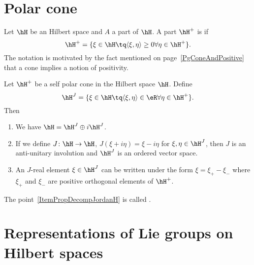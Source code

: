 \section{Polar cone}

Let $\hH$ be an Hilbert space and $A$ a part of $\hH$. A part $\hH^+$ is  if
\begin{equation}
	\hH^+=\{ \xi\in\hH\tq\langle \xi, \eta\rangle \geq 0\forall \eta\in \hH^+ \}.
\end{equation}
The notation is motivated by the fact mentioned on page~\ref{PgConeAndPositive} that a cone implies a notion of positivity.

\begin{proposition}
	Let $\hH^+$ be a self polar cone in the Hilbert space $\hH$. Define
	\begin{equation}
		\hH^J=\{ \xi\in\hH\tq\langle \xi, \eta\rangle \in\eR\forall\eta\in\hH^+ \}.
	\end{equation}
	Then
	\begin{enumerate}
		\item
		      We have $\hH=\hH^J\oplus i\hH^J$.
		\item
		      If we define $J\colon \hH\to \hH$, $J(\xi+i\eta)=\xi-i\eta$ for $\xi,\eta\in\hH^J$, then $J$ is an anti-unitary involution and $\hH^J$ is an ordered vector space.
		      \item\label{ItemPropDecompJordanH}
		      An $J$-real element $\xi\in\hH^J$ can be written under the form $\xi=\xi_+-\xi_-$ where $\xi_+$ and $\xi_-$ are positive orthogonal elements of $\hH^+$.
	\end{enumerate}
\end{proposition}
The point~\ref{ItemPropDecompJordanH} is called .


\section{Representations of Lie groups on Hilbert spaces}

